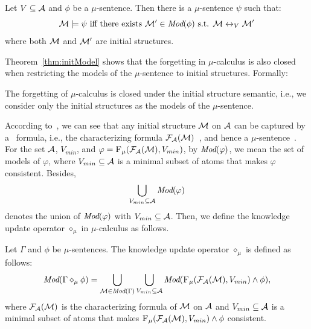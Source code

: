 \documentclass[runningheads]{llncs}
\begin{document}
\begin{theorem}\label{thm:initModel}
Let $V \subseteq \cal A$ and $\phi$ be a $\mu$-sentence. Then there is a $\mu$-sentence $\psi$ such that:
\[
    \Hm \models \psi \mbox{ iff there exists } \Hm'\in\Mod(\phi) \mbox{ s.t. } \Hm \lrto_V \Hm' %
\]
where both ${\cal M}$ and ${\cal M}'$ are initial structures.
\end{theorem}

Theorem~\ref{thm:initModel} shows that the forgetting in $\mu$-calculus is also closed when restricting the models of the $\mu$-sentence to initial structures. Formally:

\begin{corollary}
The forgetting of $\mu$-calculus is closed under the initial structure semantic, i.e., we consider only the initial structures as the models of the $\mu$-sentence.
\end{corollary}

According to~\cite{renyansfirstpaper}, we can see that any initial structure ${\cal M}$ on ${\cal A}$ can be captured by a \CTL\ formula, i.e., the characterizing formula ${\cal F}_{{\cal A}}({\cal M})$~\cite{renyansfirstpaper}, and hence a $\mu$-sentence~\cite{emerson1997model}.
For the set ${\cal A}$, $V_{min}$, and $\varphi = {\textsc{F}_{\textsc{$\mu$}}}({\cal F}_{{\cal A}}({\cal M}), V_{min})$, by $\textit{Mod}(\varphi)$, we mean the set of models of $\varphi$, where $V_{min} \subseteq {\cal A}$ is a minimal subset of atoms that makes $\varphi$ consistent.
Besides, $$\bigcup_{V_{min}\subseteq {\cal A}} \textit{Mod}(\varphi)$$ denotes the union of $\textit{Mod}(\varphi)$ with $V_{min}\subseteq {\cal A}$.
Then, we define the knowledge update operator $\diamond_{\mu}$ in $\mu$-calculus as follows.


\begin{definition}\label{def:KU}
  Let $\Gamma$ and $\phi$ be $\mu$-sentences. The knowledge update operator $\diamond_{\mu}$ is defined as follows:
  \[
  \textit{Mod}(\Gamma \diamond_{\mu} \phi) = \bigcup_{{\cal M} \in \textit{Mod}(\Gamma)} \bigcup_{V_{min}\subseteq {\cal A}} \textit{Mod}({\textsc{F}_{\textsc{$\mu$}}}({\cal F}_{{\cal A}}({\cal M}), V_{min}) \wedge \phi),
  \]
  where ${\cal F}_{{\cal A}}({\cal M})$ is the characterizing  formula of ${\cal M}$ on ${\cal A}$ and $V_{min} \subseteq {\cal A}$ is a minimal subset of atoms that makes ${\textsc{F}_{\textsc{$\mu$}}}({\cal F}_{{\cal A}}({\cal M}), V_{min}) \wedge \phi$ consistent.
\end{definition}
\end{document}
